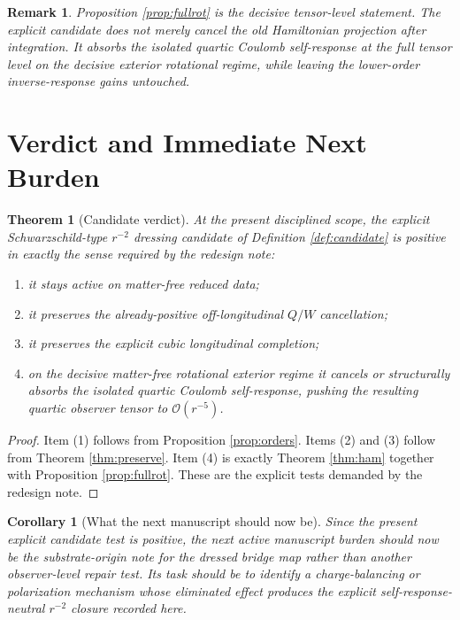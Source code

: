 \documentclass[11pt]{article}
\newtheorem{remark}{Remark}
\newtheorem{corollary}{Corollary}
\newtheorem{theorem}{Theorem}
\begin{document}
\begin{remark}
Proposition \ref{prop:fullrot} is the decisive tensor-level statement. The explicit candidate does not merely cancel the old Hamiltonian projection after integration. It absorbs the isolated quartic Coulomb self-response at the full tensor level on the decisive exterior rotational regime, while leaving the lower-order inverse-response gains untouched.
\end{remark}

\section{Verdict and Immediate Next Burden}

\begin{theorem}[Candidate verdict]
\label{thm:verdict}
At the present disciplined scope, the explicit Schwarzschild-type \(r^{-2}\) dressing candidate of Definition \ref{def:candidate} is positive in exactly the sense required by the redesign note:
\begin{enumerate}
    \item it stays active on matter-free reduced data;
    \item it preserves the already-positive off-longitudinal \(Q/W\) cancellation;
    \item it preserves the explicit cubic longitudinal completion;
    \item on the decisive matter-free rotational exterior regime it cancels or structurally absorbs the isolated quartic Coulomb self-response, pushing the resulting quartic observer tensor to \(\mathcal O(r^{-5})\).
\end{enumerate}
\end{theorem}

\begin{proof}
Item (1) follows from Proposition \ref{prop:orders}. Items (2) and (3) follow from Theorem \ref{thm:preserve}. Item (4) is exactly Theorem \ref{thm:ham} together with Proposition \ref{prop:fullrot}. These are the explicit tests demanded by the redesign note.
\end{proof}

\begin{corollary}[What the next manuscript should now be]
\label{cor:next}
Since the present explicit candidate test is positive, the next active manuscript burden should now be the substrate-origin note for the dressed bridge map rather than another observer-level repair test. Its task should be to identify a charge-balancing or polarization mechanism whose eliminated effect produces the explicit self-response-neutral \(r^{-2}\) closure recorded here.
\end{corollary}
\end{document}
